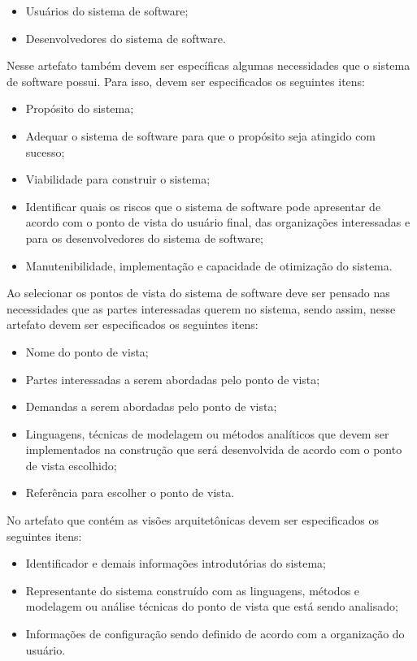 \begin{itemize}
    \item Usuários do sistema de software;
    \item Desenvolvedores do sistema de software.
\end{itemize}

Nesse artefato também devem ser específicas algumas necessidades que o sistema de software possui. Para isso, devem ser especificados os seguintes itens\cite{ISO_1471}:

\begin{itemize}
    \item Propósito do sistema;
    \item Adequar o sistema de software para que o propósito seja atingido com sucesso;
    \item Viabilidade para construir o sistema;
    \item Identificar quais os riscos que o sistema de software pode apresentar de acordo com o ponto de vista do usuário final, das organizações interessadas e para os desenvolvedores do sistema de software;
    \item Manutenibilidade, implementação e capacidade de otimização do sistema.
\end{itemize}

Ao selecionar os pontos de vista do sistema de software deve ser pensado nas necessidades que as partes interessadas querem no sistema, sendo assim, nesse artefato devem ser especificados os seguintes itens\cite{ISO_1471}:

\begin{itemize}
    \item Nome do ponto de vista;
    \item Partes interessadas a serem abordadas pelo ponto de vista;
    \item Demandas a serem abordadas pelo ponto de vista;
    \item Linguagens, técnicas de modelagem ou métodos analíticos que devem ser implementados na construção que será desenvolvida de acordo com o ponto de vista escolhido;
    \item  Referência para escolher o ponto de vista.
\end{itemize}

No artefato que contém as visões arquitetônicas devem ser especificados os seguintes itens\cite{ISO_1471}:

\begin{itemize}
    \item Identificador e demais informações introdutórias do sistema;
    \item Representante do sistema construído com as linguagens, métodos e modelagem ou análise técnicas do ponto de vista que está sendo analisado;
    \item Informações de configuração sendo definido de acordo com a organização do usuário.
\end{itemize}

